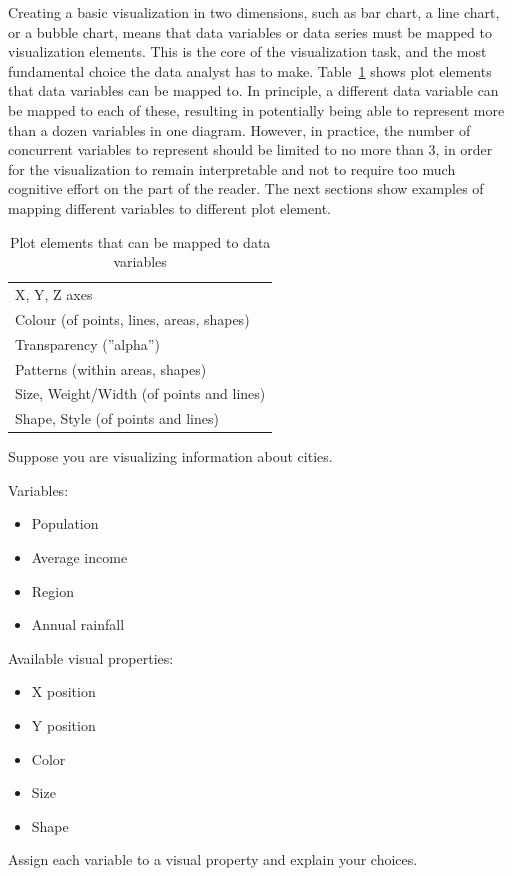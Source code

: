 Creating a basic visualization in two dimensions, such as  bar chart, a line chart, or a bubble chart, means that data variables or data series must be mapped to visualization elements. This is the core of the visualization task, and the most fundamental choice the data analyst has to make. Table~\ref{tab:elements} shows plot elements that data variables can be mapped to. In principle, a different data variable can be mapped to each of these, resulting in potentially being able to represent more than a dozen variables in one diagram. However, in practice, the number of concurrent variables to represent should be limited to no more than 3, in order for the visualization to remain interpretable and not to require too much cognitive effort on the part of the reader. The next sections show examples of mapping different variables to different plot element. 

\begin{table}[h]
\centering
\renewcommand{\arraystretch}{1.25}

\begin{tabular}{l} \hline
X, Y, Z axes \\
Colour (of points, lines, areas, shapes) \\ 
Transparency (''alpha'') \\
Patterns (within areas, shapes) \\
Size, Weight/Width (of points and lines) \\
Shape, Style (of points and lines) \\ \hline
\end{tabular}
\caption{Plot elements that can be mapped to data variables}
\label{tab:elements}
\end{table}

\begin{exerciseboxpaper}
Suppose you are visualizing information about cities.

Variables:

\begin{itemize}
\item Population
\item Average income
\item Region
\item Annual rainfall
\end{itemize}

Available visual properties:

\begin{itemize}
\item X position
\item Y position
\item Color
\item Size
\item Shape
\end{itemize}

Assign each variable to a visual property and explain your choices.
\end{exerciseboxpaper}


